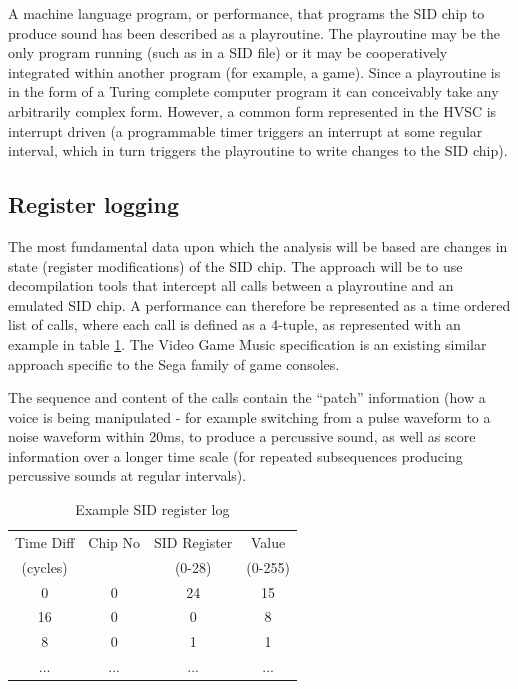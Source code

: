 \documentclass[10pt]{article}
\begin{document}
\begin{multicols*}{2}
A machine language program, or performance, that programs the SID chip to produce sound has been described as a playroutine. The playroutine may be the only program running (such as in a SID file) or it may be cooperatively integrated within another program (for example, a game). Since a playroutine is in the form of a Turing complete computer program it can conceivably take any arbitrarily complex form. However, a common form represented in the HVSC is interrupt driven (a programmable timer triggers an interrupt at some regular interval, which in turn triggers the playroutine to write changes to the SID chip).

\subsection{Register logging}
\label{reglog}

The most fundamental data upon which the analysis will be based are changes in state (register modifications) of the SID chip. The approach will be to use decompilation tools that intercept all calls between a playroutine and an emulated SID chip. A performance can therefore be represented as a time ordered list of calls, where each call is defined as a 4-tuple, as represented with an example in table \ref{table:examplelog}. The Video Game Music\cite{vgmspec} specification is an existing similar approach specific to the Sega family of game consoles.

The sequence and content of the calls contain the “patch” information (how a voice is being manipulated - for example switching from a pulse waveform to a noise waveform within 20ms, to produce a percussive sound, as well as score information over a longer time scale (for repeated subsequences producing percussive sounds at regular intervals).

\begin{table}
    \begin{tabular}{|c|c|c|c|}
        \hline
        \rule[-1ex]{0pt}{2.5ex} Time Diff & Chip No & SID Register & Value \\
        \rule[-1ex]{0pt}{2.5ex} (cycles) & & (0-28) & (0-255) \\
        \hline
        \rule[-1ex]{0pt}{2.5ex} 0 & 0 & 24 & 15 \\
        \hline
        \rule[-1ex]{0pt}{2.5ex} 16 & 0 & 0 & 8 \\
        \hline
        \rule[-1ex]{0pt}{2.5ex} 8 & 0 & 1 & 1 \\
        \hline
        \rule[-1ex]{0pt}{2.5ex} ... & ... & ... & ... \\
        \hline
    \end{tabular}
    \caption{Example SID register log}
    \label{table:examplelog}
\end{table}


\end{multicols*}
\end{document}
